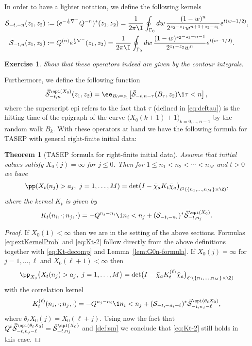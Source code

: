 \documentclass[]{pcmi}
\theoremstyle{plain}
\newtheorem{theorem}[equation]{Theorem}
\newtheorem{exercise}[equation]{Exercise}
\theoremstyle{definition}
\renewcommand{\SM}{\mathcal{S}}
\renewcommand{\SN}{\bar{\mathcal{S}}}
\begin{document}
In order to have a lighter notation, we define the following kernels
\begin{align}
 \SM_{-t,-n}(z_1,z_2) &:= (e^{-\frac{t}2 \nabla^-} Q^{-n})^*(z_1,z_2)  = \frac{1}{2\pi\I} \oint_{\Gamma_0}dw\, \frac{(1-w)^{n}}{2^{z_2-z_1} w^{n +1 + z_2 - z_1}}e^{t(w-1 / 2)},\label{def:sm}\\
 \SN_{-t,n} (z_1,z_2) &:=  \bar{Q}^{(n)}e^{\frac{t}2 \nabla^-} (z_1,z_2)= \frac{1}{2 \pi \I} \oint_{\Gamma_{0}} dw\,\frac{(1-w)^{z_2-z_1 + n - 1}}{2^{z_1-z_2} w^{n}} e^{t(w - 1 / 2)}.\label{def:sn}
\end{align}

\begin{exercise}  
Show that these operators indeed are given by the contour integrals.
\end{exercise}

\noindent Furthermore, we define the following function
\begin{equation}
\bar{\SN}_{-t,n}^{\epi(X_0)}(z_1,z_2) = \ee_{B_0=z_1}\!\left[ \SN_{-t,n - \tau}(B_{\tau}, z_2)\1{\tau<n}\right],
\end{equation}
where the superscript epi refers to the fact that $\tau$ (defined in \eqref{eq:deftau}) is the hitting time of the epigraph of the curve $\big(X_0(k+1)+1\big)_{k=0,\ldots,n-1}$ by the random walk $B_k$. With these operators at hand we have the following formula for TASEP with general right-finite initial data:

\begin{theorem}[TASEP formula for right-finite initial data]\label{thm:tasepformulas}
 Assume that initial values satisfy $X_0(j)=\infty$ for $j\le 0$. Then for  $1\leq n_1<n_2<\dotsm<n_M$ and $t>0$ we have
\begin{equation}\label{eq:extKernelProb}
  \pp\!\left(X_t(n_j)>a_j,~j=1,\ldots,M\right)=\det \bigl(I-\bar\chi_a K_t\bar\chi_a\bigr)_{\ell^2(\{n_1,\ldots,n_M\}\times\Z)},
\end{equation}
where the kernel $K_t$ is given by
\begin{equation}\label{eq:Kt-2}
K_t(n_i,\cdot;n_j,\cdot)=-Q^{n_j-n_i}\1{n_i<n_j}+(\SM_{-t,-{n}_i})^*\bar{\SN}_{-t,n_j}^{\epi(X_0)}.
\end{equation}
\end{theorem}


\begin{proof}
If $X_0(1)<\infty$ then we are in the setting of the above sections.
Formulas \eqref{eq:extKernelProb} and \eqref{eq:Kt-2} follow directly from the above definitions together with \eqref{eq:Kt-decomp} and Lemma~\ref{lem:G0n-formula}.
If $X_0(j)=\infty$ for $j=1,\ldots,\ell$ and $X_0(\ell+1)<\infty$ then 
\[
\pp_{X_0}\big(X_t(n_j)>a_j,~j=1,\ldots,M\big)=\det\!\big(I-\bar\chi_aK^{(\ell)}_t\bar\chi_a\big)_{\ell^2(\{n_1,\ldots,n_M\}\times\Z)}
\]
 with the correlation kernel
 \[
 K^{(\ell)}_t(n_i,\cdot;n_j,\cdot)=-Q^{n_j-n_i}\1{n_i<n_j}+(\SM_{-t,-{n}_i+\ell})^*{\SN}_{-t,n_j-\ell}^{\epi(\theta_\ell X_0)},
 \]
 where $\theta_\ell X_0(j) = X_0(\ell + j)$. Using now the fact that $Q^{\ell}\bar{\SN}_{-t,n_j-\ell}^{\epi(\theta_\ell X_0)}={\SN}_{-t,n_j}^{\epi(X_0)}$ and \eqref{def:sm} we conclude that \eqref{eq:Kt-2} still holds in this case.
\end{proof}
\end{document}
